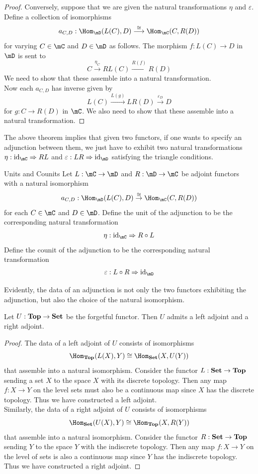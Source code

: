 \documentclass[a4paper]{article}
\begin{document}
\begin{prp}{}{}
\begin{proof}
Conversely, suppose that we are given the natural transformations $\eta$ and $\varepsilon$. Define a collection of isomorphisms $$a_{C,D}:\Hom_\mD(L(C),D)\overset{\cong}{\longrightarrow}\Hom_\mC(C,R(D))$$ for varying $C\in\mC$ and $D\in\mD$ as follows. The morphism $f:L(C)\to D$ in $\mD$ is sent to $$C\overset{\eta_C}{\to}RL(C)\overset{R(f)}{\to}R(D)$$ We need to show that these assemble into a natural transformation. \\

Now each $a_{C,D}$ has inverse given by $$L(C)\overset{L(g)}{\to}LR(D)\overset{\varepsilon_D}{\to}D$$ for $g:C\to R(D)$ in $\mC$. We also need to show that these assemble into a natural transformation. 
\end{proof}
\end{prp}

The above theorem implies that given two functors, if one wants to specify an adjunction between them, we just have to exhibit two natural transformations $\eta:\text{id}_\mC\Rightarrow RL$ and $\varepsilon:LR\Rightarrow\text{id}_\mD$ satisfying the triangle conditions. 

\begin{defn}{Units and Counits}{} Let $L:\mC\to\mD$ and $R:\mD\to\mC$ be adjoint functors with a natural isomorphism $$a_{C,D}:\Hom_\mD(L(C),D)\overset{\cong}{\to}\Hom_\mC(C,R(D))$$ for each $C\in\mC$ and $D\in\mD$. Define the unit of the adjunction to be the corresponding natural transformation $$\eta:\text{id}_\mC\Rightarrow R\circ L$$ Define the counit of the adjunction to be the corresponding natural transformation $$\varepsilon:L\circ R\Rightarrow\text{id}_\mD$$
\end{defn}

Evidently, the data of an adjunction is not only the two functors exhibiting the adjunction, but also the choice of the natural isomorphism. 

\begin{prp}{}{} Let $U:\bold{Top}\to\bold{Set}$ be the forgetful functor. Then $U$ admits a left adjoint and a right adjoint. 
\begin{proof}
The data of a left adjoint of $U$ consists of isomorphisms $$\Hom_\bold{Top}(L(X),Y)\cong\Hom_\bold{Set}(X,U(Y))$$ that assemble into a natural isomorphism. Consider the functor $L:\bold{Set}\to\bold{Top}$ sending a set $X$ to the space $X$ with its discrete topology. Then any map $f:X\to Y$ on the level sets must also be a continuous map since $X$ has the discrete topology. Thus we have constructed a left adjoint. \\

Similarly, the data of a right adjoint of $U$ consists of isomorphisms $$\Hom_\bold{Set}(U(X),Y)\cong\Hom_\bold{Top}(X,R(Y))$$ that assemble into a natural isomorphism. Consider the functor $R:\bold{Set}\to\bold{Top}$ sending $Y$ to the space $Y$ with the indiscrete topology. Then any map $f:X\to Y$ on the level of sets is also a continuous map since $Y$ has the indiscrete topology. Thus we have constructed a right adjoint. 
\end{proof}
\end{prp}
\end{document}
